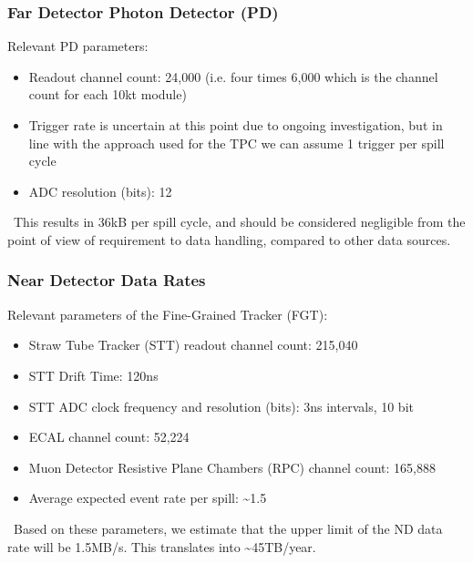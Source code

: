 

\subsubsection{Far Detector Photon Detector (PD)}
Relevant  PD parameters:
\begin{itemize}
\item Readout channel count: 24,000 (i.e. four times 6,000 which is the channel count for each 10kt module)
\item Trigger rate is uncertain at this point due to ongoing investigation, but in line with the approach used for the TPC we can assume 1 trigger per spill cycle
\item ADC resolution (bits): 12
\end{itemize}
\
This results in 36kB per spill cycle, and should be considered negligible from the point of view of requirement to data handling, compared to other data sources.

\subsubsection{Near Detector Data Rates}
Relevant parameters of the Fine-Grained Tracker (FGT):
\begin{itemize}
\item   Straw Tube Tracker (STT) readout channel count: 215,040
\item STT Drift Time: 120ns
\item STT ADC clock frequency and resolution (bits): 3ns intervals, 10 bit
\item ECAL channel count: 52,224
\item Muon Detector Resistive Plane Chambers (RPC) channel count: 165,888
\item Average expected event rate per spill: \textasciitilde 1.5
\end{itemize}
\
Based on these parameters, we estimate that the upper limit of the ND data rate will be 1.5MB/s. This translates into \textasciitilde 45TB/year. 

